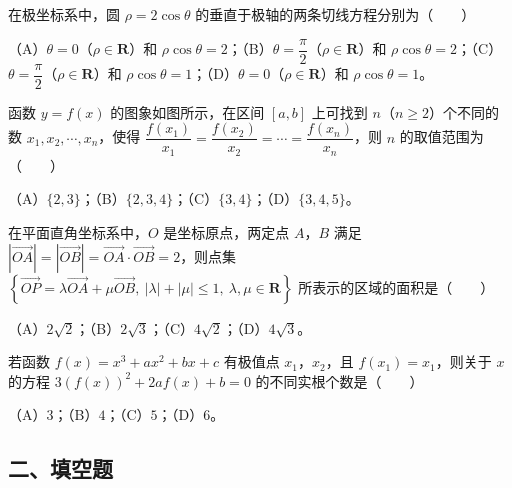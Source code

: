 \begin{question}
在极坐标系中，圆 $\rho=2\cos\theta$ 的垂直于极轴的两条切线方程分别为\mbox{（　　）}

（A）$\theta=0$（$\rho\in\mathbf R$）和 $\rho\cos\theta=2$；（B）$\theta=\dfrac{\pi}{2}$（$\rho\in\mathbf R$）和 $\rho\cos\theta=2$；（C）$\theta=\dfrac{\pi}{2}$（$\rho\in\mathbf R$）和 $\rho\cos\theta=1$；（D）$\theta=0$（$\rho\in\mathbf R$）和 $\rho\cos\theta=1$。

\Needspace{0.4\textheight}
\end{question}
\begin{question}
函数 $y=f(x)$ 的图象如图所示，在区间 $[a,b]$ 上可找到 $n$（$n\geqslant2$）个不同的数 $x_1,x_2,\cdots,x_n$，使得 $\dfrac{f(x_1)}{x_1}=\dfrac{f(x_2)}{x_2}=\cdots=\dfrac{f(x_n)}{x_n}$，则 $n$ 的取值范围为\mbox{（　　）}
\nopagebreak[4]
\begin{center}\end{center}
\nopagebreak[4]
（A）$\{2,3\}$；（B）$\{2,3,4\}$；（C）$\{3,4\}$；（D）$\{3,4,5\}$。

\end{question}
\begin{question}
在平面直角坐标系中，$O$ 是坐标原点，两定点 $A$，$B$ 满足 $|\overrightarrow{OA}|=|\overrightarrow{OB}|=\overrightarrow{OA}\cdot\overrightarrow{OB}=2$，则点集 $\left\{\overrightarrow{OP}=\lambda\overrightarrow{OA}+\mu\overrightarrow{OB},\ |\lambda|+|\mu|\leqslant1,\ \lambda,\mu\in\mathbf R\right\}$ 所表示的区域的面积是\mbox{（　　）}

（A）$2\sqrt2$；（B）$2\sqrt3$；（C）$4\sqrt2$；（D）$4\sqrt3$。

\end{question}
\begin{question}
若函数 $f(x)=x^3+ax^2+bx+c$ 有极值点 $x_1$，$x_2$，且 $f(x_1)=x_1$，则关于 $x$ 的方程 $3(f(x))^2+2af(x)+b=0$ 的不同实根个数是\mbox{（　　）}

（A）$3$；（B）$4$；（C）$5$；（D）$6$。

\end{question}
\begingroup
\renewcommand{\gkpart}[1]{\Needspace{0.2\textheight}\subsection*{#1}\nopagebreak}
\gkpart{二、填空题}
\endgroup

